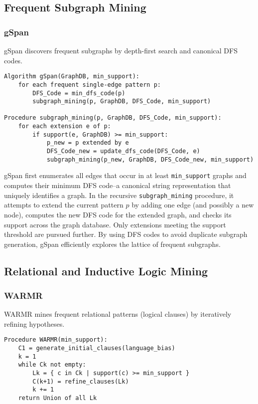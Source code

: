 \subsection{Frequent Subgraph Mining}

\subsubsection{gSpan}

gSpan \cite{yan2002gspan} discovers frequent subgraphs by depth-first search and canonical DFS codes.

\begin{verbatim}
Algorithm gSpan(GraphDB, min_support):
    for each frequent single-edge pattern p:
        DFS_Code = min_dfs_code(p)
        subgraph_mining(p, GraphDB, DFS_Code, min_support)

Procedure subgraph_mining(p, GraphDB, DFS_Code, min_support):
    for each extension e of p:
        if support(e, GraphDB) >= min_support:
            p_new = p extended by e
            DFS_Code_new = update_dfs_code(DFS_Code, e)
            subgraph_mining(p_new, GraphDB, DFS_Code_new, min_support)
\end{verbatim}

gSpan first enumerates all edges that occur in at least \texttt{min\_support} graphs and computes their minimum DFS code--a canonical string representation that uniquely identifies a graph.  In the recursive \texttt{subgraph\_mining} procedure, it attempts to extend the current pattern \(p\) by adding one edge (and possibly a new node), computes the new DFS code for the extended graph, and checks its support across the graph database.  Only extensions meeting the support threshold are pursued further.  By using DFS codes to avoid duplicate subgraph generation, gSpan efficiently explores the lattice of frequent subgraphs.

\subsection{Relational and Inductive Logic Mining}

\subsubsection{WARMR}

WARMR \cite{dehaspe1999frequent} mines frequent relational patterns (logical clauses) by iteratively refining hypotheses.

\begin{verbatim}
Procedure WARMR(min_support):
    C1 = generate_initial_clauses(language_bias)
    k = 1
    while Ck not empty:
        Lk = { c in Ck | support(c) >= min_support }
        C(k+1) = refine_clauses(Lk)
        k += 1
    return Union of all Lk
\end{verbatim}

